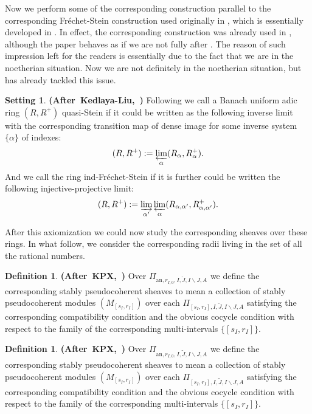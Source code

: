 \documentclass[12pt]{amsart}
\theoremstyle{definition}
\newtheorem{definition}[theorem]{Definition}
\numberwithin{equation}{section}
\newtheorem{setting}[theorem]{Setting}
\begin{document}
\indent Now we perform some of the corresponding construction parallel to the corresponding Fr\'echet-Stein construction used originally in \cite{KPX}, which is essentially developed in \cite[Section 2.6]{KL2}. In effect, the corresponding construction was already used in \cite{T1}, although the paper behaves as if we are not fully after \cite{KL2}. The reason of such impression left for the readers is essentially due to the fact that we are in the noetherian situation. Now we are not definitely in the noetherian situation, but \cite[Section 2.6]{KL2} has already tackled this issue.


\begin{setting} \mbox{\bf{(After Kedlaya-Liu, \cite[Definition 2.6.2]{KL2})}}
Following \cite[Definition 2.6.2]{KL2} we call a Banach uniform adic ring $(R,R^+)$ quasi-Stein if it could be written as the following inverse limit with the corresponding transition map of dense image for some inverse system $\{\alpha\}$ of indexes:
\begin{displaymath}
(R,R^+):=\varprojlim_{\alpha}  (R_\alpha,R_\alpha^+).	
\end{displaymath}
And we call the ring ind-Fr\'echet-Stein if it is further could be written the following injective-projective limit:
\begin{displaymath}
(R,R^+):=\varinjlim_{\alpha'}\varprojlim_{\alpha}(R_{\alpha,\alpha'} ,R_{\alpha,\alpha'}^+).	
\end{displaymath}
	
\end{setting}


\indent After this axiomization we could now study the corresponding sheaves over these rings. In what follow, we consider the corresponding radii living in the set of all the rational numbers.


\begin{definition} \mbox{\bf{(After KPX, \cite[Definition 2.1.3]{KPX})}}
Over $\Pi_{\mathrm{an},r_{I,0},I,\breve{J},I\backslash J,A}$ we define the corresponding stably pseudocoherent sheaves to mean a collection of stably pseudocoherent modules $(M_{[s_I,r_I]})$	over each $\Pi_{[s_I,r_I],I,\breve{J},I\backslash J,A}$ satisfying the corresponding compatibility condition and the obvious cocycle condition with respect to the family of the corresponding multi-intervals $\{[s_I,r_I]\}$.
\end{definition}


\begin{definition} \mbox{\bf{(After KPX, \cite[Definition 2.1.3]{KPX})}}
Over $\Pi_{\mathrm{an},r_{I,0},I,\widetilde{J},I\backslash J,A}$ we define the corresponding stably pseudocoherent sheaves to mean a collection of stably pseudocoherent modules $(M_{[s_I,r_I]})$	over each $\Pi_{[s_I,r_I],I,\widetilde{J},I\backslash J,A}$ satisfying the corresponding compatibility condition and the obvious cocycle condition with respect to the family of the corresponding multi-intervals $\{[s_I,r_I]\}$.
\end{definition}
\end{document}
